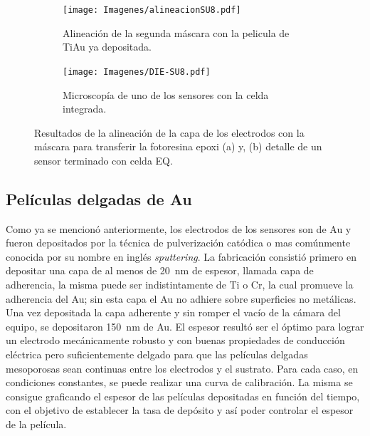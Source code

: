 { 				%
 				\begin{figure}[bh!]
			 	   	    \centering
			 	   	    \begin{subfigure}[t]{0.495\textwidth}
			        	\texttt{[image: Imagenes/alineacionSU8.pdf]}
			       		\caption{Alineación de la segunda máscara con la pelicula de Ti\textbar Au ya depositada.}
			         	\label{fig:alineacion}
			     		\end{subfigure}
			     		\begin{subfigure}[t]{0.495\textwidth}
			     		\texttt{[image: Imagenes/DIE-SU8.pdf]}
			    		\caption{Microscopía de uno de los sensores con la celda integrada.}
			     		\label{fig:die-su8}	
						\end{subfigure}
						\caption[Alineación y celda integrada en SU8]{Resultados de la alineación de la capa de los electrodos con la máscara para transferir la fotoresina epoxi (a) y, (b) detalle de un sensor terminado con celda EQ.}
			     		\label{fig:resultados-su8}
			     	   	\end{figure}

 		\subsection{Películas delgadas de Au}

		 Como ya se mencionó anteriormente, los electrodos de los sensores son de Au y fueron depositados por la técnica de pulverización catódica o mas comúnmente conocida por su nombre en inglés \textit{sputtering}. La fabricación consistió primero en depositar una capa de al menos de \SI{20}{\nm} de espesor, llamada capa de  adherencia, la misma puede ser indistintamente de Ti o Cr, la cual promueve la adherencia del Au; sin esta capa el Au no adhiere sobre superficies no metálicas.\cite{Hieber1976} Una vez depositada la capa adherente y sin romper el vacío de la cámara del equipo, se depositaron \SI{150}{nm} de Au. El espesor resultó ser el óptimo para lograr un electrodo mecánicamente robusto y con buenas propiedades de conducción eléctrica pero suficientemente delgado para que las películas delgadas mesoporosas sean continuas entre los electrodos y el sustrato. Para cada caso, en condiciones constantes, se puede realizar una curva de calibración. La misma se consigue graficando el espesor de las películas depositadas en función del tiempo, con el objetivo de establecer la tasa de depósito y así poder controlar el espesor de la película. 

}
